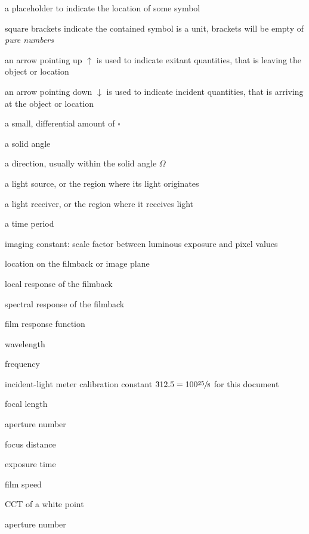\begin{description}[leftmargin=!,labelwidth={5em}]
\item[ {$\square$} ] a placeholder to indicate the location of some symbol
\item[ {$[\square]$} ] square brackets indicate the contained symbol is a unit,
	brackets will be empty of \emph{pure numbers}
\item[ {$\square^\uparrow$} ] an arrow pointing up $\uparrow$ is used to indicate 
	exitant quantities, that is leaving the object or location
\item[ {$\square^\downarrow$} ] an arrow pointing down $\downarrow$ is used to indicate 
	incident quantities, that is arriving at the object or location

\item[ {$\delta\square$} ] a small, differential amount of $\square$

\item[{$\Omega$}] a solid angle
\item[{$\omega$}] a direction, usually within the solid angle $\Omega$
\item[$S$] a light source, or the region where its light originates
\item[$R$] a light receiver, or the region where it receives light
\item[{$t\;[\unit\second]$} ] a time period
\item[$k_i$] imaging constant: scale factor between luminous exposure and pixel values
\item[$p^{img}$] location on the filmback or image plane
\item[$W_{pos}(p^{img})$] local response of the filmback
\item[$W_{col}(\lambda)$] spectral response of the filmback
\item[$W(p^{img},\lambda)$] film response function

\item[{$\lambda\;[\unit\meter]$} ] wavelength
\item[{$\nu\;[\unit\hertz]$} ] frequency

\item[{$C$}] incident-light meter calibration constant $312.5 = 100 \sfrac{25}8$ for this document
\item[{$f$}] focal length
\item[{$N$}] aperture number
\item[{$o$}] focus distance
\item[{$\Delta t$}] exposure time
\item[{$S$}] film speed
\item[{$T_{cp}$}] \gls{CCT} of a white point
\item[{$N$}] aperture number




\end{description}
